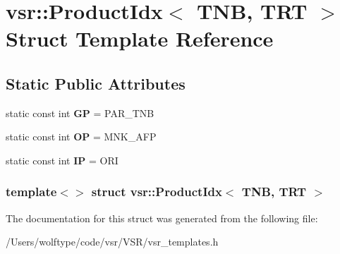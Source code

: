 \hypertarget{structvsr_1_1_product_idx_3_01_t_n_b_00_01_t_r_t_01_4}{\section{vsr\-:\-:Product\-Idx$<$ T\-N\-B, T\-R\-T $>$ Struct Template Reference}
\label{structvsr_1_1_product_idx_3_01_t_n_b_00_01_t_r_t_01_4}
}
\subsection*{Static Public Attributes}
\begin{DoxyCompactItemize}
\item 
\hypertarget{structvsr_1_1_product_idx_3_01_t_n_b_00_01_t_r_t_01_4_a3f7a4def1a42f430dd74a5cbb1cc3d0b}{static const int {\bfseries G\-P} = P\-A\-R\-\_\-\-T\-N\-B}\label{structvsr_1_1_product_idx_3_01_t_n_b_00_01_t_r_t_01_4_a3f7a4def1a42f430dd74a5cbb1cc3d0b}

\item 
\hypertarget{structvsr_1_1_product_idx_3_01_t_n_b_00_01_t_r_t_01_4_a10ee63064596d746de1d17e5cf3d21b3}{static const int {\bfseries O\-P} = M\-N\-K\-\_\-\-A\-F\-P}\label{structvsr_1_1_product_idx_3_01_t_n_b_00_01_t_r_t_01_4_a10ee63064596d746de1d17e5cf3d21b3}

\item 
\hypertarget{structvsr_1_1_product_idx_3_01_t_n_b_00_01_t_r_t_01_4_a741314ebbd25f3fa1876a6f85385bdd5}{static const int {\bfseries I\-P} = O\-R\-I}\label{structvsr_1_1_product_idx_3_01_t_n_b_00_01_t_r_t_01_4_a741314ebbd25f3fa1876a6f85385bdd5}

\end{DoxyCompactItemize}
\subsubsection*{template$<$$>$ struct vsr\-::\-Product\-Idx$<$ T\-N\-B, T\-R\-T $>$}



The documentation for this struct was generated from the following file\-:\begin{DoxyCompactItemize}
\item 
/\-Users/wolftype/code/vsr/\-V\-S\-R/vsr\-\_\-templates.\-h\end{DoxyCompactItemize}
